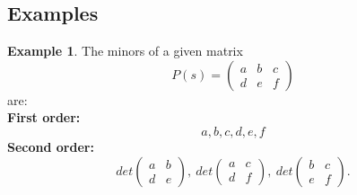 \documentclass[a4paper,12 pt]{article}
\numberwithin{equation}{section}
\theoremstyle{definition}
\newtheorem{bsp}{Example}
\theoremstyle{remark}
\theoremstyle{definition}
\theoremstyle{definition}
\theoremstyle{definition}
\theoremstyle{remark}
\begin{document}
\subsection{Examples}
\begin{bsp}
The minors of a given matrix
\begin{equation*} P(s) = \begin{pmatrix}a & b & c \\ d & e & f\end{pmatrix}
\end{equation*}
are:\\
\textbf{First order:}
$$ a, b, c, d, e, f$$
\textbf{Second order:}
\begin{equation*} det\begin{pmatrix}a & b \\ d & e\end{pmatrix}, \ det\begin{pmatrix}a & c \\ d & f\end{pmatrix}, \ det \begin{pmatrix}b & c \\ e & f\end{pmatrix}.
\end{equation*}
\end{bsp}
\newpage
\end{document}
